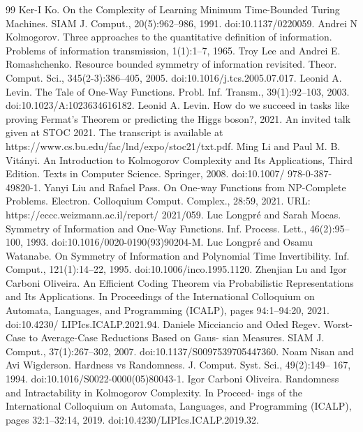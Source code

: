 \documentclass[10pt,a4paper]{article}
\begin{document}
\begin{thebibliography}{99}
 Ker-I Ko. On the Complexity of Learning Minimum Time-Bounded Turing Machines. SIAM J. Comput., 20(5):962–986, 1991. doi:10.1137/0220059.
 Andrei N Kolmogorov. Three approaches to the quantitative definition of information. Problems of information transmission, 1(1):1–7, 1965.
 Troy Lee and Andrei E. Romashchenko. Resource bounded symmetry of information revisited. Theor. Comput. Sci., 345(2-3):386–405, 2005. doi:10.1016/j.tcs.2005.07.017.
 Leonid A. Levin. The Tale of One-Way Functions. Probl. Inf. Transm., 39(1):92–103, 2003. doi:10.1023/A:1023634616182.
 Leonid A. Levin. How do we succeed in tasks like proving Fermat’s Theorem or predicting the Higgs boson?, 2021. An invited talk given at STOC 2021. The transcript is available at https://www.cs.bu.edu/fac/lnd/expo/stoc21/txt.pdf.
 Ming Li and Paul M. B. Vitányi. An Introduction to Kolmogorov Complexity and Its Applications, Third Edition. Texts in Computer Science. Springer, 2008. doi:10.1007/ 978-0-387-49820-1.
 Yanyi Liu and Rafael Pass. On One-way Functions from NP-Complete Problems. Electron. Colloquium Comput. Complex., 28:59, 2021. URL: https://eccc.weizmann.ac.il/report/ 2021/059.
 Luc Longpré and Sarah Mocas. Symmetry of Information and One-Way Functions. Inf. Process. Lett., 46(2):95–100, 1993. doi:10.1016/0020-0190(93)90204-M.
 Luc Longpré and Osamu Watanabe. On Symmetry of Information and Polynomial Time Invertibility. Inf. Comput., 121(1):14–22, 1995. doi:10.1006/inco.1995.1120.
 Zhenjian Lu and Igor Carboni Oliveira. An Efficient Coding Theorem via Probabilistic Representations and Its Applications. In Proceedings of the International Colloquium on Automata, Languages, and Programming (ICALP), pages 94:1–94:20, 2021. doi:10.4230/ LIPIcs.ICALP.2021.94.
 Daniele Micciancio and Oded Regev. Worst-Case to Average-Case Reductions Based on Gaus- sian Measures. SIAM J. Comput., 37(1):267–302, 2007. doi:10.1137/S0097539705447360.
 Noam Nisan and Avi Wigderson. Hardness vs Randomness. J. Comput. Syst. Sci., 49(2):149– 167, 1994. doi:10.1016/S0022-0000(05)80043-1.
 Igor Carboni Oliveira. Randomness and Intractability in Kolmogorov Complexity. In Proceed- ings of the International Colloquium on Automata, Languages, and Programming (ICALP), pages 32:1–32:14, 2019. doi:10.4230/LIPIcs.ICALP.2019.32.

\end{thebibliography}
\end{document}
